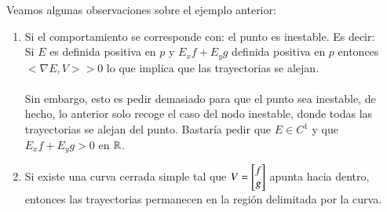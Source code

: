 \begin{obs}
    Veamos algunas observaciones sobre el ejemplo anterior:\\
    \begin{enumerate}
        \item Si el comportamiento se corresponde con: %
             el punto es inestable. Es decir:\\
             Si $E$ es definida positiva en $p$ y $E_x f + E_y g$ definida positiva en $p$ entonces $<\nabla E, V> > 0$ lo que implica que las trayectorias se alejan.\\\\
             Sin embargo, esto es pedir demasiado para que el punto sea inestable, de hecho, lo anterior solo recoge el caso del nodo inestable, donde todas las trayectorias se alejan del punto. Bastaría pedir que $E \in C^1$ y que $E_x f + E_y g > 0$ en $\mathbb{R}$.
        \item Si existe una curva cerrada simple tal que $V = \mx{f\\ g}$ apunta hacia dentro, entonces las trayectorias permanecen en la región delimitada por la curva.
    \end{enumerate}
\end{obs}
